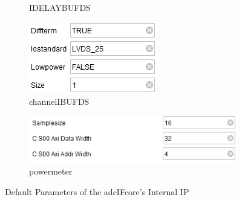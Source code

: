 \documentclass[11pt]{article}
\begin{document}
\begin{figure}[H]
\begin{subfigure}[t]{0.4\linewidth}
		\caption{IDELAYBUFDS}
	\end{subfigure}
	\begin{subfigure}[t]{0.4\linewidth}
		\includegraphics[width=\linewidth]{images/default_param_channel_IBUFDS}
		\caption{channel\textunderscore IBUFDS}
	\end{subfigure}
	\begin{subfigure}[t]{0.4\linewidth}
		\includegraphics[width=\linewidth]{images/default_param_power_meter}
		\caption{power\textunderscore meter}
	\end{subfigure}
	\caption{Default Parameters of the adc\textunderscore IF\textunderscore core's Internal IP} 
	\label{fig:adcIFparams}
\end{figure}
\end{document}
